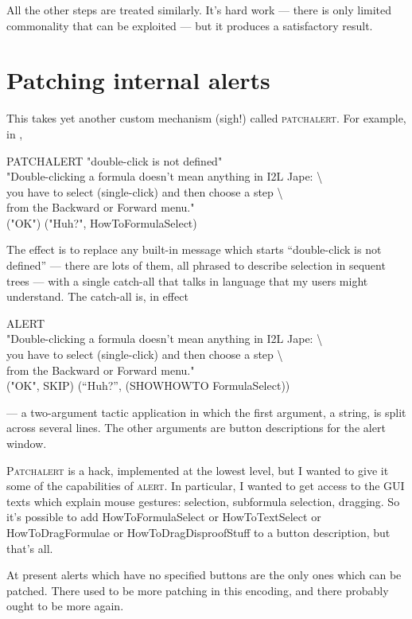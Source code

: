 All the other steps are treated similarly. It's hard work --- there is only limited commonality that can be exploited --- but it produces a satisfactory result.

\section{Patching internal alerts}

This takes yet another custom mechanism (sigh!) called \textsc{patchalert}. For example, in ,
\begin{japeish}
PATCHALERT "double-click is not defined" \\
\tab "Double-clicking a formula doesn't mean anything in I2L Jape: {\textbackslash} \\
\tab {\textbackslash}you have to select (single-click) and then choose a step {\textbackslash} \\
\tab {\textbackslash}from the Backward or Forward menu." \\
\tab ("OK") ("Huh?", HowToFormulaSelect)
\end{japeish}
The effect is to replace any built-in message which starts ``double-click is not defined'' --- there are lots of them, all phrased to describe selection in sequent trees --- with a single catch-all that talks in language that my users might understand. The catch-all is, in effect 
\begin{japeish}
ALERT \\
\tab "Double-clicking a formula doesn't mean anything in I2L Jape: {\textbackslash} \\
\tab {\textbackslash}you have to select (single-click) and then choose a step {\textbackslash} \\
\tab {\textbackslash}from the Backward or Forward menu." \\
\tab ("OK", SKIP) (``Huh?'', (SHOWHOWTO FormulaSelect))
\end{japeish}
--- a two-argument tactic application in which the first argument, a string, is split across several lines. The other arguments are button descriptions for the alert window.

\textsc{Patchalert} is a hack, implemented at the lowest level, but I wanted to give it some of the capabilities of \textsc{alert}. In particular, I wanted to get access to the GUI texts which explain mouse gestures: selection, subformula selection, dragging. So it's possible to add HowToFormulaSelect or HowToTextSelect or HowToDragFormulae or HowToDragDisproofStuff to a button description, but that's all.

At present alerts which have no specified buttons are the only ones which can be patched. There used to be more patching in this encoding, and there probably ought to be more again.